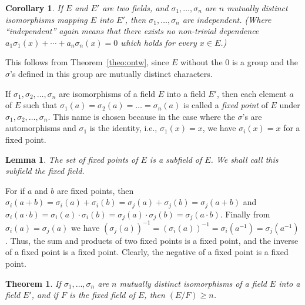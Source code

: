 \documentclass[10pt,leqno,a5paper]{book}
\newtheorem{theo}{Theorem}
\newtheorem*{lemm*}{Lemma}
\newtheorem*{coro*}{Corollary}
\theoremstyle{definition}
\begin{document}
\begin{coro*}
If $E$ and $E'$ are two fields, and $\sigma_1, \ldots, \sigma_n$ are $n$ mutually distinct isomorphisms mapping $E$ into $E'$, then $\sigma_1, \ldots, \sigma_n$ are independent.
(Where ``independent'' again means that there exists no non-trivial dependence $a_1 \sigma_1(x) + \cdots + a_n \sigma_n(x) = 0$ which holds for every $x \in E$.)
\end{coro*}


This follows from Theorem~\ref{theo:ontw}, since $E$ without the 0 is a group and the $\sigma$'s defined in this group are mutually distinct characters.

If $\sigma_1, \sigma_2, \ldots, \sigma_n$ are isomorphisms of a field $E$ into a field $E'$, then each element $a$ of $E$ such that $\sigma_1(a) = \sigma_2(a) = \ldots = \sigma_n(a)$ is called a \emph{fixed point} of $E$ under $\sigma_1, \sigma_2, \ldots, \sigma_n$.
This name is chosen because in the case where the $\sigma$'s are automorphisms and $\sigma_1$ is the identity, i.e., $\sigma_1(x) = x$, we have $\sigma_i(x) = x$ for a fixed point.


\begin{lemm*}
The set of fixed points of $E$ is a subfield of $E$.
We shall call this subfield the fixed field.
\end{lemm*}

For if $a$ and $b$ are fixed points, then $\sigma_i(a + b) = \sigma_i(a) + \sigma_i(b) = \sigma_j(a) + \sigma_j(b) = \sigma_j(a + b)$ and $\sigma_i(a \cdot b) = \sigma_i(a) \cdot \sigma_i(b) = \sigma_j(a) \cdot \sigma_j(b) = \sigma_j(a \cdot b)$.
Finally from $\sigma_i(a) = \sigma_j(a)$ we have $(\sigma_j(a))^{-1} = (\sigma_i(a))^{-1} = \sigma_i(a^{-1}) = \sigma_j(a^{-1})$.
Thus, the sum and products of two fixed points is a fixed point, and the inverse of a fixed point is a fixed point.
Clearly, the negative of a fixed point is a fixed point.


\begin{theo}
\label{theo:onth}
If $\sigma_1, \ldots, \sigma_n$ are $n$ mutually distinct isomorphisms of a field $E$ into a field $E'$, and if $F$ is the fixed field of $E$, then $(E/F) \geq n$.
\end{theo}
\end{document}
